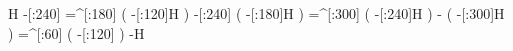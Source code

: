            H%
     -[:240]%
    =^[:180]%
               (
         -[:120]H%
               )
     -[:240]%
               (
         -[:180]H%
               )
    =^[:300]%
               (
         -[:240]H%
               )
           -%
               (
         -[:300]H%
               )
     =^[:60]%
               (
         -[:120]%
               )
           -H%